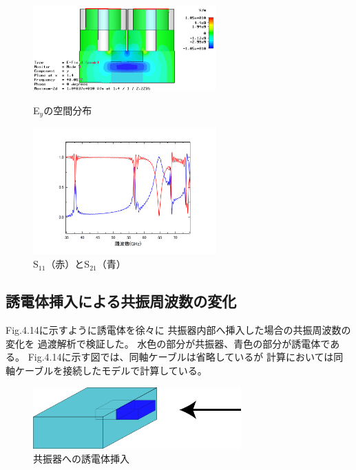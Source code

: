 \begin{figure}[h]
 \begin{minipage}{0.5\hsize}
  \begin{center}
   \includegraphics[width=70mm]{./image/model73_y_x.png}
  \end{center}
  \caption{E$_y$の空間分布}
  \label{fig:one}
 \end{minipage}
 \begin{minipage}{0.5\hsize}
  \begin{center}
   \includegraphics[width=70mm]{./image/Graph4.jpg}
  \end{center}
  \caption{S$_{11}$（赤）とS$_{21}$（青）}
  \label{fig:two}
 \end{minipage}
\end{figure}

\subsection*{誘電体挿入による共振周波数の変化}
Fig.4.14に示すように誘電体を徐々に
共振器内部へ挿入した場合の共振周波数の変化を
過渡解析で検証した。
水色の部分が共振器、青色の部分が誘電体である。
Fig.4.14に示す図では、同軸ケーブルは省略しているが
計算においては同軸ケーブルを接続したモデルで計算している。
\vspace{10 mm}

\begin{figure}[h]
  \begin{center}
    \includegraphics[width=8cm]{./image/insert.png}
    \caption{共振器への誘電体挿入}
    \label{fig:insert}
  \end{center}
\end{figure}

